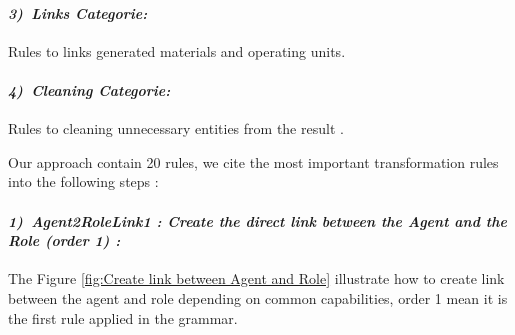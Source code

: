 \paragraph{\emph{3)~Links Categorie:} } 
Rules to links generated materials and operating units.

\paragraph{\emph{4)~Cleaning Categorie:} } 
Rules to cleaning unnecessary entities from the result .


Our approach contain 20 rules, we cite the most important transformation rules into the following steps : 


\paragraph{\emph{1)~Agent2RoleLink1 : Create the direct link between the Agent and the Role (order 1) :} } 
The Figure \ref{fig:Create link between Agent and Role} illustrate how to create link between the agent and role
depending on common capabilities, order 1 mean it is the first rule applied in the grammar.

